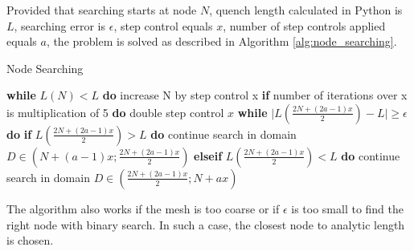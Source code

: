 Provided that searching starts at node $N$, quench length calculated in Python is $L$, searching error is $\epsilon$, step control equals $x$, number of step controls applied equals $a$, the problem is solved as described in Algorithm \ref{alg:node_searching}.

\begin{algorithm}
    \caption{Node Searching}
    \label{alg:node_searching}
    \begin{algorithmic}[1]
    \STATE \textbf{while} $L(N) < L$ \textbf{do}
    \STATE \hspace{0.5cm} increase N by step control x
    \STATE \hspace{0.5cm} \textbf{if} number of iterations over x is multiplication of 5 \textbf{do}
    \STATE \hspace{1.0cm} double step control $x$
    \STATE \textbf{while} $\mid L(\frac{2N+(2a-1)x}{2}) - L \mid \geq \epsilon$ \textbf{do}
    \STATE \hspace{0.5cm} \textbf{if} $L(\frac{2N+(2a-1)x}{2}) > L$ \textbf{do}
    \STATE \hspace{1.0cm} continue search in domain $D \in (N+(a-1)x ; \frac{2N+(2a-1)x}{2})$
    \STATE \hspace{0.5cm} \textbf{elseif} $L(\frac{2N+(2a-1)x}{2}) < L$ \textbf{do}
    \STATE \hspace{1.0cm} continue search in domain $D \in (\frac{2N+(2a-1)x}{2} ; N+ax)$
    \end{algorithmic}
\end{algorithm}

The algorithm also works if the mesh is too coarse or if $\epsilon$ is too small to find the right node with binary search. In such a case, the closest node to analytic length is chosen.